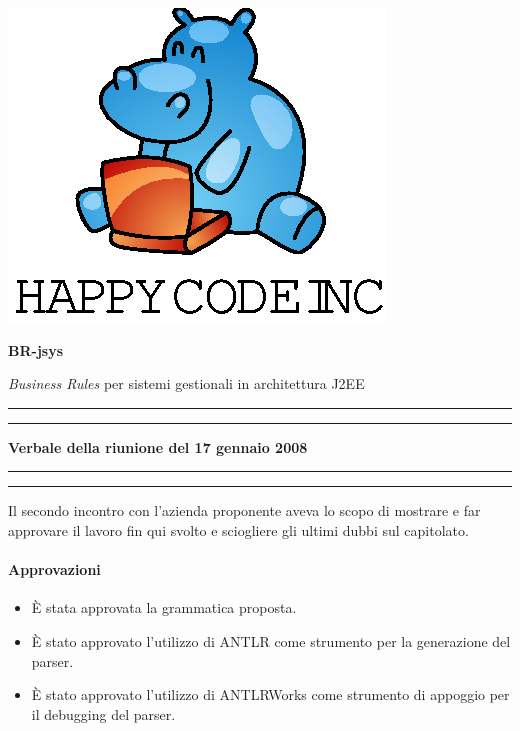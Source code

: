 \documentclass[11pt,titlepage,a4paper]{report}
\begin{document}
\begin{titlepage}
\begin{center}
\vspace*{0.5in}
\includegraphics{logo.eps}
\vspace*{0.2in}

{\Large \textbf{BR-jsys}}

{\Large \emph{Business Rules} per sistemi gestionali in architettura J2EE } 
\vspace{1.3in}
\par\rule{10cm}{.4pt} \par
\par\rule{12cm}{1pt} \par
\vspace*{0.5in}
\LARGE \textbf {Verbale della riunione del 17 gennaio 2008}
\vspace*{0.5in}
\par\rule{12cm}{1pt} \par
\par\rule{10cm}{.4pt} \par

\end{center}
\end{titlepage}
\vspace*{0.5in}
\thispagestyle{plain}
Il secondo incontro con l'azienda proponente aveva lo scopo di mostrare e far approvare il lavoro fin qui svolto e sciogliere gli ultimi dubbi sul capitolato.

\paragraph{Approvazioni}
\begin{itemize}

\item \`E stata approvata la grammatica proposta.
\item \`E stato approvato l'utilizzo di ANTLR come strumento per la generazione del parser.
\item \`E stato approvato l'utilizzo di ANTLRWorks come strumento di appoggio per il debugging del parser.

\end{itemize}
\end{document}

